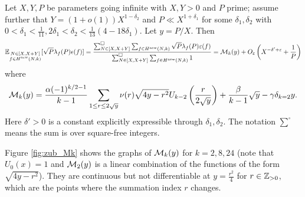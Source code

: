 \begin{theorem}
    \label{thm:zubrilina_modform}
    Let $X, Y, P$ be parameters going infinite with $X, Y > 0$ and $P$ prime; assume further that $Y = (1 + o(1))X^{1 - \delta_2}$ and $P \ll X^{1 + \delta_1}$ for some $\delta_1, \delta_2$ with $0 < \delta_1 < \frac{1}{11}, 2\delta_1 < \delta_2 < \frac{1}{13}(4 - 18 \delta_1)$.
    Let $y = P/X$. Then
    \begin{equation}
        \label{eqn:zubrilina_modform}
        \mathbb{E}_{\substack{N \in [X, X + Y] \\ f\in H^{\mathrm{new}}(N, k)}} [\sqrt{P} \lambda_f(P) \epsilon(f)] = \frac{\sum_{N \in [X, X + Y]}^\square \sum_{f \in H^{\mathrm{new}}(N, k)} \sqrt{P} \lambda_f(P) \varepsilon(f)}{\sum_{N \in  [X, X + Y]}^\square \sum_{f \in H^{\mathrm{new}}(N, k)} 1} = \mathcal{M}_k(y) + O_\varepsilon \left(X^{-\delta' + \varepsilon} + \frac{1}{P}\right)
    \end{equation}
    where
    \begin{equation}
        \mathcal{M}_k(y) = \frac{\alpha(-1)^{k/2 - 1}}{k - 1} \sum_{1 \le r \le 2\sqrt{y}} \nu(r) \sqrt{4y - r^2} U_{k - 2} \left(\frac{r}{2\sqrt{y}}\right) + \frac{\beta}{k-1} \sqrt{y} - \gamma \delta_{k=2} y.
    \end{equation}
    Here $\delta' > 0$ is a constant explicitly expressible through $\delta_1, \delta_2$.
    The notation $\sum^\square$ means the sum is over square-free integers.
\end{theorem}

Figure \ref{fig:zub_Mk} shows the graphs of $\mathcal{M}_k(y)$ for $k = 2, 8, 24$ (note that $U_0(x) = 1$ and $\mathcal{M}_2(y)$ is a linear combination of the functions of the form $\sqrt{4y - r^2}$).
They are continuous but not differentiable at $y = \frac{r^2}{4}$ for $r \in \mathbb{Z}_{>0}$, which are the points where the summation index $r$ changes.

